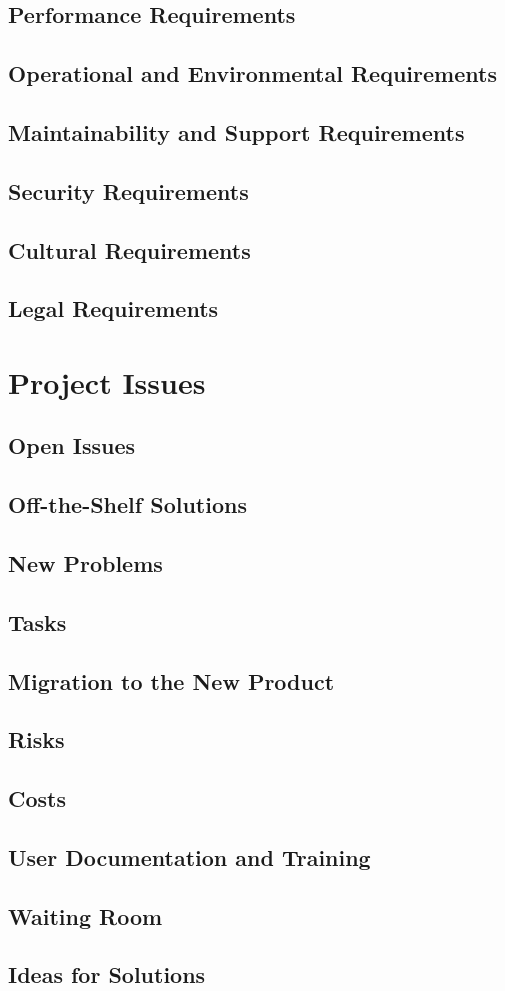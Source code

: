 \documentclass[12pt]{report}
\begin{document}
\section{Performance Requirements}\label{sec:Performance}
\section{Operational and Environmental Requirements}\label{sec:Operational}
\section{Maintainability and Support Requirements}\label{sec:Support}
\section{Security Requirements}\label{sec:Security}
\section{Cultural Requirements}\label{sec:Cultural}
\section{Legal Requirements}\label{sec:Legal}

\chapter{Project Issues}\label{ch:issues}
\section{Open Issues}\label{sec:issues}
\section{Off-the-Shelf Solutions}\label{sec:solutions}
\section{New Problems}\label{sec:NewProblems}
\section{Tasks}\label{sec:Tasks}
\section{Migration to the New Product}\label{sec:Migration}
\section{Risks}\label{sec:Risks}
\section{Costs}\label{sec:Costs}
\section{User Documentation and Training}\label{sec:UserDoc}
\section{Waiting Room}\label{sec:Waiting}
\section{Ideas for Solutions}\label{sec:Solutions}
\end{document}

